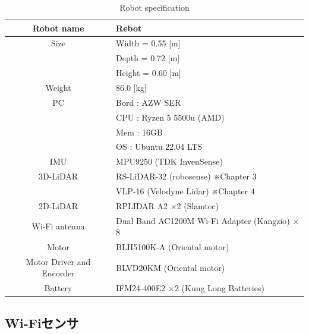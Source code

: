 \begin{table}[h]
 \begin{center}
 \caption{Robot specification}
  \begin{tabular}{|c||l|} \hline
    Robot name & Rebot \\ \hline \hline
    Size & Width = 0.55 [m] \\
    & Depth = 0.72 [m] \\
    &Height = 0.60 [m] \\ \hline
    Weight & 86.0 [kg] \\ \hline
    PC & Bord : AZW SER \\ 
     & CPU : Ryzen 5 5500u (AMD) \\
     & Mem : 16GB \\
     & OS : Ubuntu 22.04 LTS \\ \hline
    IMU & MPU9250 (TDK InvenSense) \\ \hline
    3D-LiDAR & RS-LiDAR-32 (robosense) ※Chapter 3 \\
             & VLP-16 (Velodyne Lidar) ※Chapter 4\\ \hline
    2D-LiDAR & RPLIDAR A2 $\times$2 (Slamtec) \\ \hline
    Wi-Fi antenna & Dual Band AC1200M Wi-Fi Adapter (Kangzio) $\times$8 \\ \hline
    Motor & BLH5100K-A (Oriental motor) \\ \hline
    Motor Driver and Encorder & BLVD20KM (Oriental motor) \\ \hline
    Battery & IFM24-400E2 $\times$2 (Kung Long Batteries) \\  \hline
   \end{tabular}
  \label{tab:spec_nict}
 \end{center}
\end{table}
\subsection{Wi-Fiセンサ}


